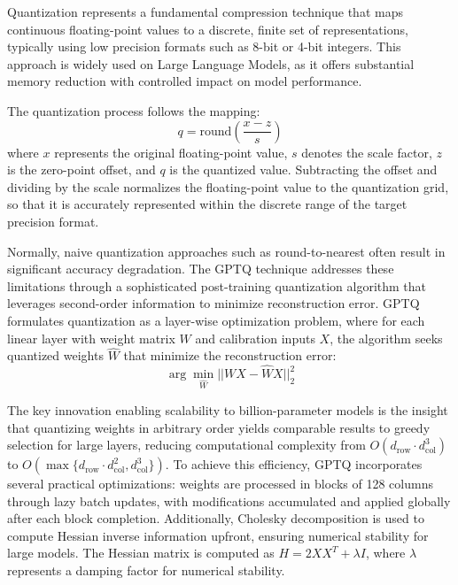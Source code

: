 Quantization represents a fundamental compression technique that maps continuous floating-point values to a discrete, finite set of representations, typically using low precision formats such as 8-bit or 4-bit integers. This approach is widely used on Large Language Models, as it offers substantial memory reduction with controlled impact on model performance.

The quantization process follows the mapping:
\begin{equation}
q = \text{round}\left(\frac{x - z}{s}\right)
\end{equation}
where $x$ represents the original floating-point value, $s$ denotes the scale factor, $z$ is the zero-point offset, and $q$ is the quantized value. Subtracting the offset and dividing by the scale normalizes the floating-point value to the quantization grid, so that it is accurately represented within the discrete range of the target precision format.

Normally, naive quantization approaches such as round-to-nearest often result in significant accuracy degradation. The GPTQ technique \cite{gptq_quantization} addresses these limitations through a sophisticated post-training quantization algorithm that leverages second-order information to minimize reconstruction error. GPTQ formulates quantization as a layer-wise optimization problem, where for each linear layer with weight matrix $W$ and calibration inputs $X$, the algorithm seeks quantized weights $\hat{W}$ that minimize the reconstruction error:
\begin{equation}
\arg\min_{\hat{W}} ||WX - \hat{W}X||_2^2
\end{equation}

The key innovation enabling scalability to billion-parameter models is the insight that quantizing weights in arbitrary order yields comparable results to greedy selection for large layers, reducing computational complexity from $O(d_{\text{row}} \cdot d_{\text{col}}^3)$ to $O(\max\{d_{\text{row}} \cdot d_{\text{col}}^2, d_{\text{col}}^3\})$. To achieve this efficiency, GPTQ incorporates several practical optimizations: weights are processed in blocks of 128 columns through lazy batch updates, with modifications accumulated and applied globally after each block completion. Additionally, Cholesky decomposition is used to compute Hessian inverse information upfront, ensuring numerical stability for large models. The Hessian matrix is computed as $H = 2XX^T + \lambda I$, where $\lambda$ represents a damping factor for numerical stability.

